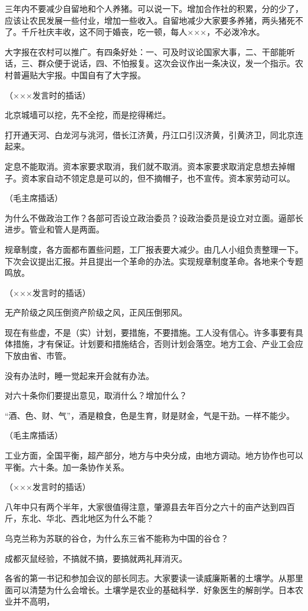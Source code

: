 三年内不要减少自留地和个人养猪。可以说一下。增加合作社的积累，分的少了，应该让农民发展一些付业，增加一些收入。自留地减少大家要多养猪，两头猪死不了。千斤社庆丰收，这不同于婚丧，吃一顿，每人×××，不必泼冷水。

大字报在农村可以推广。有四条好处：一、可及时议论国家大事，二、干部能听话，三、群众便于说话，四、不怕报复。这次会议作出一条决议，发一个指示。农村普遍贴大宇报。中国自有了大字报。

（×××发言时的插话）

北京城墙可以挖，先不全挖，而是挖得稀烂。

打开通天河、白龙河与洮河，借长江济黄，丹江口引汉济黄，引黄济卫，同北京连起来。

定息不能取消。资本家要求取消，我们就不取消。资本家要求取消定息想去掉帽子。资本家自动不领定息是可以的，但不摘帽子，也不宣传。资本家劳动可以。

（毛主席插话）

为什么不做政治工作？各部可否设立政治委员？设政治委员是设立对立面。逼部长进步。管业和管人是两面。

规章制度，各方面都布置些问题，工厂报表要大减少。由几人小组负责整理一下。下次会议提出汇报。并且提出一个革命的办法。实现规章制度革命。各地来个专题鸣放。

（×××发言时的插话）

无产阶级之风压倒资产阶级之风，正风压倒邪风。

现在有些虚，不是（实）计划，要措施，不要措施。工人没有信心。许多事要有具体措施，才有保证。计划要和措施结合，否则计划会落空。地方工会、产业工会应下放由省、市管。

没有办法时，睡一觉起来开会就有办法。

对六十条你们要提出意见，取消什么？增加什么？

“酒、色、财、气”，酒是粮食，色是生育，财是财金，气是干劲。一样不能少。

（毛主席插话）

工业方面，全国平衡，超产部分，地方与中央分成，由地方调动。地方协作也可以平衡。六十条。加一条协作关系。

（×××发言时的插话）

八年中只有两个半年，大家很值得注意，肇源县去年百分之六十的亩产达到四百斤，东北、华北、西北地区为什么不能？

乌克兰称为苏联的谷仓，为什么东三省不能称为中国的谷仓？

成都灭鼠经验，不搞就不搞，要搞就两礼拜消灭。

各省的第一书记和参加会议的部长同志。大家要读一读威廉斯著的土壤学。从那里面可以清楚为什么会增长。土壤学是农业的基础科学．好象医生的解剖学。日本农业并不高明，


